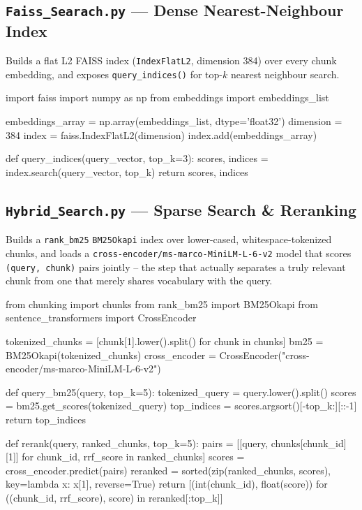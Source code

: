 \documentclass[11pt,a4paper]{article}
\begin{document}
\subsection{\texttt{Faiss\_Searach.py} --- Dense Nearest-Neighbour Index}

Builds a flat L2 FAISS index (\texttt{IndexFlatL2}, dimension 384) over every
chunk embedding, and exposes \texttt{query\_indices()} for top-$k$ nearest
neighbour search.

\begin{pycode}
import faiss
import numpy as np
from embeddings import embeddings_list

embeddings_array = np.array(embeddings_list, dtype='float32')
dimension = 384
index = faiss.IndexFlatL2(dimension)
index.add(embeddings_array)

def query_indices(query_vector, top_k=3):
    scores, indices = index.search(query_vector, top_k)
    return scores, indices
\end{pycode}

\subsection{\texttt{Hybrid\_Search.py} --- Sparse Search \& Reranking}

Builds a \texttt{rank\_bm25} \texttt{BM25Okapi} index over lower-cased,
whitespace-tokenized chunks, and loads a
\texttt{cross-encoder/ms-marco-MiniLM-L-6-v2} model that scores
\texttt{(query, chunk)} pairs jointly -- the step that actually separates a
truly relevant chunk from one that merely shares vocabulary with the query.

\begin{pycode}
from chunking import chunks
from rank_bm25 import BM25Okapi
from sentence_transformers import CrossEncoder

tokenized_chunks = [chunk[1].lower().split() for chunk in chunks]
bm25 = BM25Okapi(tokenized_chunks)
cross_encoder = CrossEncoder("cross-encoder/ms-marco-MiniLM-L-6-v2")

def query_bm25(query, top_k=5):
    tokenized_query = query.lower().split()
    scores = bm25.get_scores(tokenized_query)
    top_indices = scores.argsort()[-top_k:][::-1]
    return top_indices

def rerank(query, ranked_chunks, top_k=5):
    pairs = [[query, chunks[chunk_id][1]] for chunk_id, rrf_score in ranked_chunks]
    scores = cross_encoder.predict(pairs)
    reranked = sorted(zip(ranked_chunks, scores), key=lambda x: x[1], reverse=True)
    return [(int(chunk_id), float(score))
            for ((chunk_id, rrf_score), score) in reranked[:top_k]]
\end{pycode}
\end{document}
